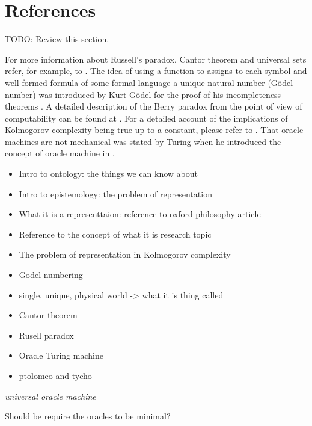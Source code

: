%
%

\section{References}

{\color{red} TODO: Review this section.}

For more information about Russell's paradox, Cantor theorem and universal sets refer, for example, to \cite{jech2013set}. The idea of using a function to assigns to each symbol and well-formed formula of some formal language a unique natural number (Gödel number) was introduced by Kurt Gödel for the proof of his incompleteness theorems \cite{godel1931formal}. A detailed description of the Berry paradox from the point of view of computability can be found at \cite{chaitin1995berry}. For a detailed account of the implications of Kolmogorov complexity being true up to a constant, please refer to \cite{li2013introduction}. That oracle machines are not mechanical was stated by Turing when he introduced the concept of oracle machine in \cite{turing1939systems}.

\begin{itemize}
\item Intro to ontology: the things we can know about
\item Intro to epistemology: the problem of representation
\item What it is a representtaion: reference to oxford philosophy article
\item Reference to the concept of what it is research topic
\item The problem of representation in Kolmogorov complexity
\item Godel numbering
\item single, unique, physical world -> what it is thing called
\item Cantor theorem
\item Rusell paradox
\item Oracle Turing machine
\item ptolomeo and tycho
\end{itemize}

\emph{universal oracle machine}

Should be require the oracles to be minimal?
